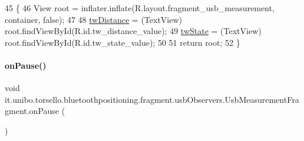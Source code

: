 \begin{DoxyCode}
45                                                         \{
46         View root = inflater.inflate(R.layout.fragment\_usb\_measurement, container, \textcolor{keyword}{false});
47 
48         \hyperlink{classit_1_1unibo_1_1torsello_1_1bluetoothpositioning_1_1fragment_1_1usbObservers_1_1UsbMeasurementFragment_a6158a86ee112db847f0bca648d8e21fc_a6158a86ee112db847f0bca648d8e21fc}{twDistance} = (TextView) root.findViewById(R.id.tw\_distance\_value);
49         \hyperlink{classit_1_1unibo_1_1torsello_1_1bluetoothpositioning_1_1fragment_1_1usbObservers_1_1UsbMeasurementFragment_a5ce90223eb1d85ed6dffa5ef36d7ff69_a5ce90223eb1d85ed6dffa5ef36d7ff69}{twState} = (TextView) root.findViewById(R.id.tw\_state\_value);
50 
51         \textcolor{keywordflow}{return} root;
52     \}
\end{DoxyCode}
\hypertarget{classit_1_1unibo_1_1torsello_1_1bluetoothpositioning_1_1fragment_1_1usbObservers_1_1UsbMeasurementFragment_aa063ee103779be3e6ab9d911abbbe20b_aa063ee103779be3e6ab9d911abbbe20b}{}\label{classit_1_1unibo_1_1torsello_1_1bluetoothpositioning_1_1fragment_1_1usbObservers_1_1UsbMeasurementFragment_aa063ee103779be3e6ab9d911abbbe20b_aa063ee103779be3e6ab9d911abbbe20b} 
\paragraph{\texorpdfstring{on\+Pause()}{onPause()}}
{\footnotesize\ttfamily void it.\+unibo.\+torsello.\+bluetoothpositioning.\+fragment.\+usb\+Observers.\+Usb\+Measurement\+Fragment.\+on\+Pause (\begin{DoxyParamCaption}{ }\end{DoxyParamCaption})}


